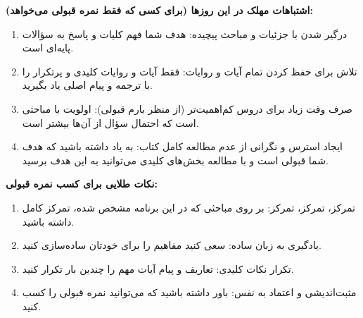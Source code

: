 \documentclass[12pt,a4paper]{article}
\newcommand{\sectionbreak}{\noindent\hrulefill\par\vspace{0.5em}}
\begin{document}
\sectionbreak
\vspace{1em}

\textbf{اشتباهات مهلک در این روزها (برای کسی که فقط نمره قبولی می‌خواهد):}
\begin{enumerate}
    \item درگیر شدن با جزئیات و مباحث پیچیده: هدف شما فهم کلیات و پاسخ به سؤالات پایه‌ای است.
    \item تلاش برای حفظ کردن تمام آیات و روایات: فقط آیات و روایات کلیدی و پرتکرار را با ترجمه و پیام اصلی یاد بگیرید.
    \item صرف وقت زیاد برای دروس کم‌اهمیت‌تر (از منظر بارم قبولی): اولویت با مباحثی است که احتمال سؤال از آن‌ها بیشتر است.
    \item ایجاد استرس و نگرانی از عدم مطالعه کامل کتاب: به یاد داشته باشید که هدف شما قبولی است و با مطالعه بخش‌های کلیدی می‌توانید به این هدف برسید.
\end{enumerate}
\vspace{1em}

\textbf{نکات طلایی برای کسب نمره قبولی:}
\begin{enumerate}
    \item تمرکز، تمرکز، تمرکز: بر روی مباحثی که در این برنامه مشخص شده، تمرکز کامل داشته باشید.
    \item یادگیری به زبان ساده: سعی کنید مفاهیم را برای خودتان ساده‌سازی کنید.
    \item تکرار نکات کلیدی: تعاریف و پیام آیات مهم را چندین بار تکرار کنید.
    \item مثبت‌اندیشی و اعتماد به نفس: باور داشته باشید که می‌توانید نمره قبولی را کسب کنید.
\end{enumerate}
\end{document}
